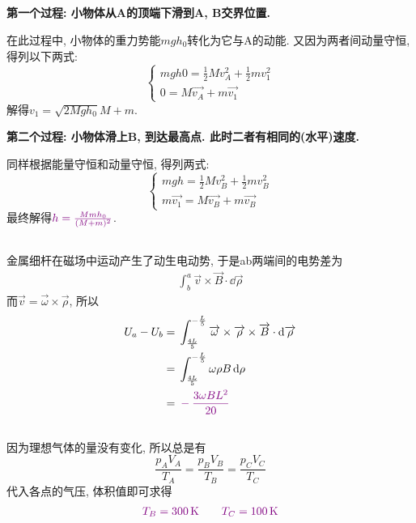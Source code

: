 \documentclass[12pt]{ctexart}
\begin{document}
\subsection{}
\textbf{第一个过程: 小物体从A的顶端下滑到A, B交界位置.}\par
在此过程中, 小物体的重力势能$mgh_{0}$转化为它与A的动能. 又因为两者间动量守恒, 得列以下两式:
\[\begin{cases}
	mgh{0}=\frac{1}{2}Mv_{A}^{2}+\frac{1}{2}mv_{1}^{2}\\
	0=M\overrightarrow{v_{A}}+m\overrightarrow{v_{1}}
\end{cases}\]
解得$v_{1}=\sqrt{2Mgh_{0}}{M+m}$.\par
\textbf{第二个过程: 小物体滑上B, 到达最高点. 此时二者有相同的(水平)速度.}\par
同样根据能量守恒和动量守恒, 得列两式:
\[\begin{cases}
	mgh=\frac{1}{2}Mv_{B}^{2}+\frac{1}{2}mv_{B}^{2}\\
	m\overrightarrow{v_{1}}=M\overrightarrow{v_{B}}+m\overrightarrow{v_{B}}
\end{cases}\]
最终解得$\color{violet}h=\frac{Mmh_{0}}{(M+m)^{2}}$.\par
\subsection{}
金属细杆在磁场中运动产生了动生电动势, 于是ab两端间的电势差为
\begin{align*}
	\int_{b}^{a}\overrightarrow{v}\times\overrightarrow{B}\cdot\dd{\overrightarrow{\rho}}
\end{align*}
而$\overrightarrow{v}=\overrightarrow{\omega}\times\overrightarrow{\rho}$, 所以
\begin{align*}
	U_a-U_b={}&\int_{\frac{4L}{5}}^{-\frac{L}{5}}\overrightarrow{\omega}\times\overrightarrow{\rho}\times\overrightarrow{B}\cdot\dd{\overrightarrow{\rho}}\\
	={}&\int_{\frac{4L}{5}}^{-\frac{L}{5}}\omega\rho B\dd{\rho}\\
	={}&\color{violet}-\frac{3\omega BL^{2}}{20}
\end{align*}\par
\subsection{}
\subsubsection{}
因为理想气体的量没有变化, 所以总是有
\[\frac{p_{A}V_{A}}{T_{A}}=\frac{p_{B}V_{B}}{T_{B}}=\frac{p_{C}V_{C}}{T_{C}}\]
代入各点的气压, 体积值即可求得
\begin{align*}\color{violet}
	T_{B}=300\,\mathrm{K}\qquad T_{C}=100\,\mathrm{K}
\end{align*}\par
\end{document}
